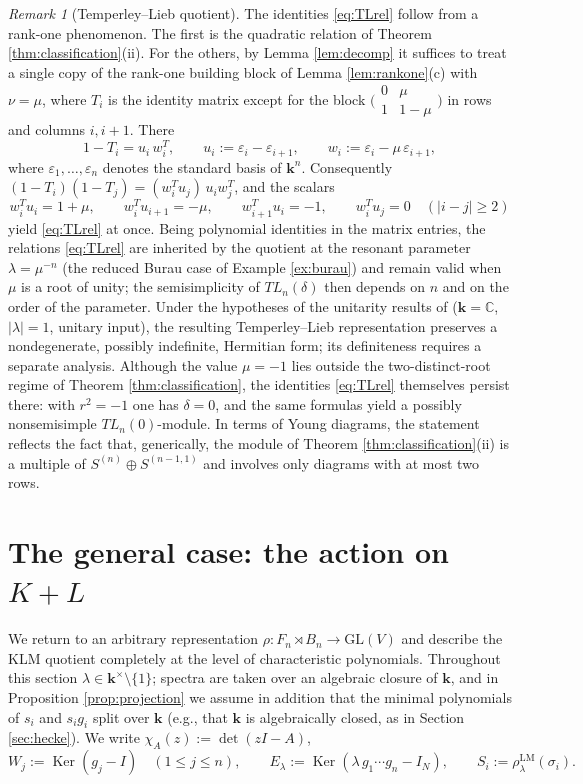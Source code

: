 \documentclass[11pt]{article}
\theoremstyle{definition}
\theoremstyle{remark}
\newtheorem{remark}[theorem]{Remark}
\newcommand{\GL}{\mathrm{GL}}
\newcommand{\Ker}{\operatorname{Ker}}
\newcommand{\kk}{\boldsymbol{k}}
\newcommand{\rLMl}{\rho^{\mathrm{LM}}_{\lambda}}
\begin{document}
\begin{remark}[Temperley--Lieb quotient]
The identities \eqref{eq:TLrel} follow from a rank-one phenomenon. The
first is the quadratic relation of Theorem \ref{thm:classification}(ii).
For the others, by Lemma \ref{lem:decomp} it suffices to treat a single
copy of the rank-one building block of Lemma \ref{lem:rankone}(c) with
$\nu = \mu$, where $T_i$ is the identity matrix except for the block
$\bigl(\begin{smallmatrix} 0 & \mu \\ 1 & 1 - \mu \end{smallmatrix}
\bigr)$ in rows and columns $i, i+1$. There
\[
1 - T_i = u_i\, w_i^{T}, \qquad
u_i := \varepsilon_i - \varepsilon_{i+1}, \qquad
w_i := \varepsilon_i - \mu\, \varepsilon_{i+1},
\]
where $\varepsilon_1, \dots, \varepsilon_n$ denotes the standard basis
of $\kk^n$. Consequently
$(1 - T_i)(1 - T_j) = (w_i^{T} u_j)\, u_i w_j^{T}$, and the scalars
\[
w_i^{T} u_i = 1 + \mu, \qquad
w_i^{T} u_{i+1} = -\mu, \qquad
w_{i+1}^{T} u_i = -1, \qquad
w_i^{T} u_j = 0 \quad (|i - j| \geq 2)
\]
yield \eqref{eq:TLrel} at once. Being polynomial identities in the
matrix entries, the relations \eqref{eq:TLrel} are inherited by the
quotient at the resonant parameter $\lambda = \mu^{-n}$ (the reduced
Burau case of Example \ref{ex:burau}) and remain valid when $\mu$ is a
root of unity; the semisimplicity of $TL_n(\delta)$ then depends on $n$
and on the order of the parameter. Under the hypotheses of the
unitarity results of \cite{Negami25} ($\kk = \mathbb{C}$,
$|\lambda| = 1$, unitary input), the resulting Temperley--Lieb
representation preserves a nondegenerate, possibly indefinite,
Hermitian form; its definiteness requires a separate analysis. Although
the value $\mu = -1$ lies outside the two-distinct-root regime of
Theorem \ref{thm:classification}, the identities \eqref{eq:TLrel}
themselves persist there: with $r^2 = -1$ one has $\delta = 0$, and the
same formulas yield a possibly nonsemisimple $TL_n(0)$-module. In terms of Young diagrams, the statement reflects the
fact that, generically, the module of Theorem
\ref{thm:classification}(ii) is a multiple of
$S^{(n)} \oplus S^{(n-1,1)}$ and involves only diagrams with at most
two rows.
\end{remark}


\section{The general case: the action on
\texorpdfstring{$K + L$}{K+L}}\label{sec:general}

We return to an arbitrary representation
$\rho \colon F_n \rtimes B_n \to \GL(V)$ and describe the KLM quotient
completely at the level of characteristic polynomials. Throughout this
section $\lambda \in \kk^{\times} \setminus \{1\}$; spectra are taken
over an algebraic closure of $\kk$, and in Proposition
\ref{prop:projection} we assume in addition that the minimal
polynomials of $s_i$ and $s_i g_i$ split over $\kk$ (e.g., that $\kk$
is algebraically closed, as in Section \ref{sec:hecke}). We write
$\chi_A(z) := \det(zI - A)$,
\[
W_j := \Ker(g_j - I) \quad (1 \le j \le n),
\qquad
E_{\lambda} := \Ker(\lambda\, g_1 \cdots g_n - I_N),
\qquad
S_i := \rLMl(\sigma_i).
\]
\end{document}
